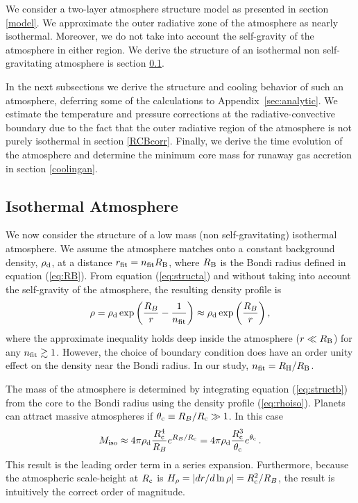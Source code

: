 \documentclass[apj]{emulateapj}
\newcommand{\App}[1]{Appendix~\ref{#1}}
\newcommand{\RB}{R_{\rm B}}
\newcommand{\co}{_{\rm c}}
\newcommand{\di}{_{\rm d}}
\begin{document}
We consider a two-layer atmosphere structure model as presented in section \ref{model}. We approximate the outer radiative zone of the atmosphere as nearly isothermal. Moreover, we do not take into account the self-gravity of the atmosphere in either region. We derive the structure of an isothermal non self-gravitating atmosphere is section \ref{iso}. 

In the next subsections we derive the structure and cooling behavior of such an atmosphere, deferring some of the calculations to \App{sec:analytic}. We estimate the temperature and pressure corrections at the radiative-convective boundary due to the fact that the outer radiative region of the atmosphere is not purely isothermal in section \ref{RCBcorr}. Finally, we derive the time evolution of the atmosphere and determine the minimum core mass for runaway gas accretion in section \ref{coolingan}.

\subsection{Isothermal Atmosphere}
\label{iso}

We now consider the structure of a low mass (non self-gravitating) isothermal atmosphere.  We assume the atmosphere matches onto a constant background density, $\rho_{\rm d}$, at a distance $r_{\rm fit} = n_{\rm fit} \RB$, where $R_{\rm B}$ is the Bondi radius defined in equation (\ref{eq:RB}). From equation (\ref{eq:structa}) and without taking into account the self-gravity of the atmosphere, the resulting density profile is
\begin{equation} \label{eq:rhoiso}
\rho = \rho_{\rm d} \exp \left({R_B \over r} - {1 \over n_{\rm{fit}}} \right) \approx   \rho_{\rm{d}} \exp \left(R_B \over r  \right),
\end{equation} 
where the approximate inequality holds deep inside the atmosphere ($r \ll \RB$) for any $n_{\rm fit} \gtrsim 1$.  However, the choice of boundary condition does have an order unity effect on the density near the Bondi radius. In our study, $n_{\rm{fit}}=R_{\rm H}/R_{\rm B}$.

The mass of the atmosphere is determined by integrating equation (\ref{eq:structb}) from the core to the Bondi radius using the density profile (\ref{eq:rhoiso}).  Planets can attract massive atmospheres if $\theta\co \equiv R_B/R\co \gg 1$.  In this case
\begin{equation} \label{eq:MatmISO}
M_{\rm iso} \approx 4 \pi \rho\di {R\co^4 \over R_B} e^{R_B/R\co} = 4 \pi \rho\di {R\co^3 \over \theta\co} e^{\theta\co}\, .
\end{equation} 
This result is the leading order term in a series expansion.  Furthermore, because the atmospheric scale-height at $R\co$ is $H_\rho = |dr /d\ln\rho| = R\co^2/R_B$, the result is intuitively the correct order of magnitude.
\end{document}

